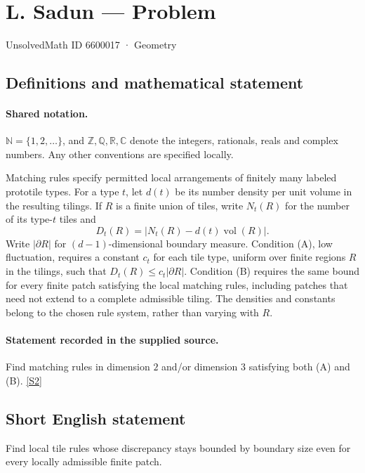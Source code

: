 \documentclass[11pt]{article}
\newcommand{\sref}[2]{\hyperlink{source:#1:#2}{[S#2]}}
\begin{document}
\setcounter{section}{6600016}
\section{L. Sadun — Problem}\label{6600017}
{\small\sffamily UnsolvedMath ID 6600017 · Geometry}
\subsection{Definitions and mathematical statement}

\paragraph{Shared notation.}$\mathbb N=\{1,2,\ldots\}$, and $\mathbb Z,\mathbb Q,\mathbb R,\mathbb C$ denote the integers, rationals, reals and complex numbers. Any other conventions are specified locally.


Matching rules specify permitted local arrangements of finitely many labeled prototile types. For a type $t$, let $d(t)$ be its number density per unit volume in the resulting tilings. If $R$ is a finite union of tiles, write $N_t(R)$ for the number of its type-$t$ tiles and
\[D_t(R)=|N_t(R)-d(t)\operatorname{vol}(R)|.\]
Write $|\partial R|$ for $(d-1)$-dimensional boundary measure. Condition (A), low fluctuation, requires a constant $c_t$ for each tile type, uniform over finite regions $R$ in the tilings, such that $D_t(R)\leq c_t|\partial R|$. Condition (B) requires the same bound for every finite patch satisfying the local matching rules, including patches that need not extend to a complete admissible tiling. The densities and constants belong to the chosen rule system, rather than varying with $R$.
\paragraph{Statement recorded in the supplied source.}
Find matching rules in dimension $2$ and/or dimension $3$ satisfying both (A) and (B). \sref{6600017}{2}
\subsection{Short English statement}
Find local tile rules whose discrepancy stays bounded by boundary size even for every locally admissible finite patch.
\end{document}

